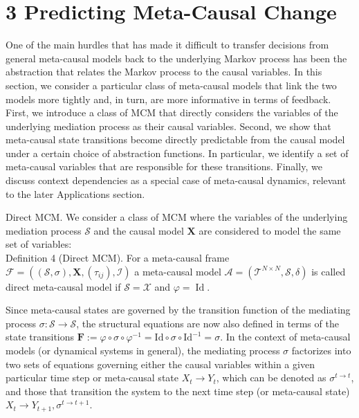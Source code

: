 \documentclass[10pt]{article}
\begin{document}
\section*{3 Predicting Meta-Causal Change}
One of the main hurdles that has made it difficult to transfer decisions from general meta-causal models back to the underlying Markov process has been the abstraction that relates the Markov process to the causal variables. In this section, we consider a particular class of meta-causal models that link the two models more tightly and, in turn, are more informative in terms of feedback. First, we introduce a class of MCM that directly considers the variables of the underlying mediation process as their causal variables. Second, we show that meta-causal state transitions become directly predictable from the causal model under a certain choice of abstraction functions. In particular, we identify a set of meta-causal variables that are responsible for these transitions. Finally, we discuss context dependencies as a special case of meta-causal dynamics, relevant to the later Applications section.

Direct MCM. We consider a class of MCM where the variables of the underlying mediation process $\mathcal{S}$ and the causal model $\mathbf{X}$ are considered to model the same set of variables:\\
Definition 4 (Direct MCM). For a meta-causal frame $\mathcal{F}=\left((\mathcal{S}, \sigma), \mathbf{X},\left(\tau_{i j}\right), \mathcal{I}\right)$ a meta-causal model $\mathcal{A}=\left(\mathcal{T}^{N \times N}, \mathcal{S}, \delta\right)$ is called direct meta-causal model if $\mathcal{S}=\mathcal{X}$ and $\varphi=\operatorname{Id}$.

Since meta-causal states are governed by the transition function of the mediating process $\sigma: \mathcal{S} \rightarrow \mathcal{S}$, the structural equations are now also defined in terms of the state transitions $\mathbf{F}:=\varphi \circ \sigma \circ \varphi^{-1}= \mathrm{Id} \circ \sigma \circ \mathrm{Id}^{-1}=\sigma$. In the context of meta-causal models (or dynamical systems in general), the mediating process $\sigma$ factorizes into two sets of equations governing either the causal variables within a given particular time step or meta-causal state $X_{t} \rightarrow Y_{t}$, which can be denoted as $\sigma^{t \rightarrow t}$, and those that transition the system to the next time step (or meta-causal state) $X_{t} \rightarrow Y_{t+1}, \sigma^{t \rightarrow t+1}$.
\end{document}
